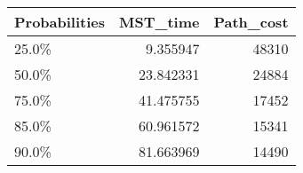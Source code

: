 \begin{tabular}{lrr}
\toprule
Probabilities &   MST\_time &  Path\_cost \\
\midrule
        25.0\% &   9.355947 &      48310 \\
        50.0\% &  23.842331 &      24884 \\
        75.0\% &  41.475755 &      17452 \\
        85.0\% &  60.961572 &      15341 \\
        90.0\% &  81.663969 &      14490 \\
\bottomrule
\end{tabular}
